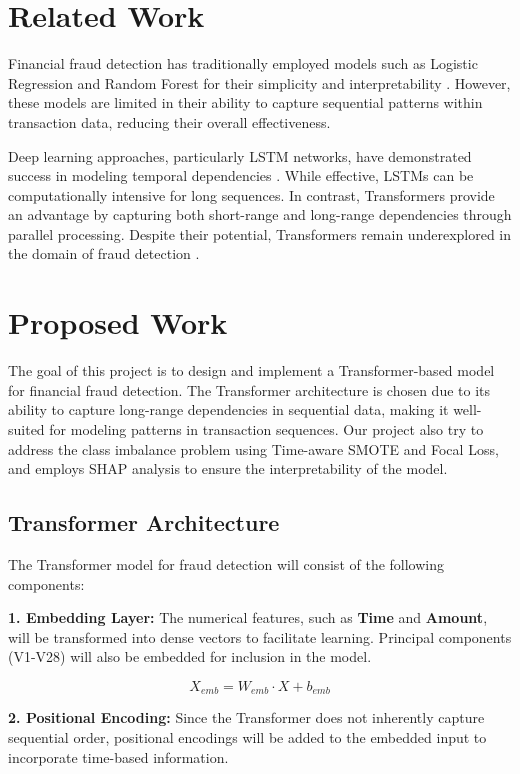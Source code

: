 \documentclass[11pt, oneside]{article}   	%
\begin{document}
\section{Related Work}

Financial fraud detection has traditionally employed models such as Logistic Regression and Random Forest for their simplicity and interpretability \cite{ali2022financial}. However, these models are limited in their ability to capture sequential patterns within transaction data, reducing their overall effectiveness.

Deep learning approaches, particularly LSTM networks, have demonstrated success in modeling temporal dependencies \cite{alghofaili2020financial}. While effective, LSTMs can be computationally intensive for long sequences. In contrast, Transformers \cite{NIPS2017_3f5ee243} provide an advantage by capturing both short-range and long-range dependencies through parallel processing. Despite their potential, Transformers remain underexplored in the domain of fraud detection \cite{wang2023financial}.


\section{Proposed Work}

The goal of this project is to design and implement a Transformer-based model for financial fraud detection. The Transformer architecture is chosen due to its ability to capture long-range dependencies in sequential data, making it well-suited for modeling patterns in transaction sequences. Our project also try to address the class imbalance problem using Time-aware SMOTE and Focal Loss, and employs SHAP analysis to ensure the interpretability of the model.

\subsection{Transformer Architecture}
The Transformer model for fraud detection will consist of the following components:

\textbf{1. Embedding Layer:} The numerical features, such as \textbf{Time} and \textbf{Amount}, will be transformed into dense vectors to facilitate learning. Principal components (V1-V28) will also be embedded for inclusion in the model.

\[
X_{emb} = W_{emb} \cdot X + b_{emb}
\]

\textbf{2. Positional Encoding:} Since the Transformer does not inherently capture sequential order, positional encodings will be added to the embedded input to incorporate time-based information.
\end{document}
